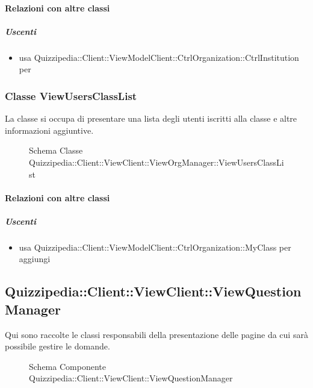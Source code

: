 \paragraph{Relazioni con altre classi}
\subparagraph{Uscenti}
\begin{itemize}
\item usa Quizzipedia::Client::ViewModelClient::CtrlOrganization::CtrlInstitution per 
\end{itemize}
\subsubsection{Classe ViewUsersClassList}
La classe si occupa di presentare una lista degli utenti iscritti alla classe e altre informazioni aggiuntive.
\begin{figure}[H]
\centering
\noindent{}
\caption[Schema Classe ViewUsersClassList]{Schema Classe Quizzipedia::Client::ViewClient::ViewOrgManager::ViewUsersClassList}
\end{figure}
\paragraph{Relazioni con altre classi}
\subparagraph{Uscenti}
\begin{itemize}
\item usa Quizzipedia::Client::ViewModelClient::CtrlOrganization::MyClass per aggiungi
\end{itemize}
\subsection{Quizzipedia::Client::ViewClient::ViewQuestionManager}
Qui sono raccolte le classi responsabili della presentazione delle pagine da cui sarà possibile gestire le domande.
\begin{figure}[H]
\centering
\noindent{}
\caption[Schema Componente Quizzipedia::Client::ViewClient::ViewQuestionManager]{Schema Componente Quizzipedia::Client::ViewClient::ViewQuestionManager}
\end{figure}
